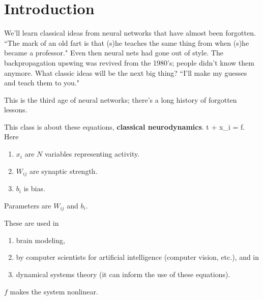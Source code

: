 \def\filepath{C:/Users/Owner/Dropbox/Math/templates}





%


%

\pagestyle{fancy}
\chead{} 
\rhead{} 
\lfoot{} 
\cfoot{\thepage} 
\rfoot{} 
\renewcommand{\headrulewidth}{.3pt} 
\setlength\voffset{0in}
\setlength\textheight{648pt}


\section{Introduction}
We'll learn classical ideas from neural networks that have almost been forgotten. ``The mark of an old fart is that (s)he teaches the same thing from when (s)he became a professor." Even then neural nets had gone out of style. The backpropagation upswing was revived from the 1980's; people didn't know them anymore. What classic ideas will be the next big thing? ``I'll make my guesses and teach them to you."

This is the third age of neural networks; there's a long history of forgotten lessons.

This class is about these equations, \textbf{classical neurodynamics}.
\tau {}t + x_i = f.
\eeq
Here
\begin{enumerate}
\item $x_i$ are $N$ variables representing activity.
\item $W_{ij}$ are synaptic strength.
\item $b_i$ is bias.
\end{enumerate}
Parameters are $W_{ij}$ and $b_i$.

These are used in 
\begin{enumerate}
\item
brain modeling, 
\item
by computer scientists for artificial intelligence (computer vision, etc.), and in 
\item 
dynamical systems theory (it can inform the use of these equations).
\end{enumerate}
$f$ makes the system nonlinear.

